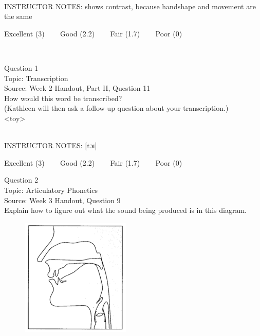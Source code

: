 \documentclass[12pt]{article}
\begin{document}
~\\
INSTRUCTOR NOTES: shows contrast, because handshape and movement are the same


\vfill
Excellent (3) ~~~ Good (2.2) ~~~ Fair (1.7) ~~~ Poor (0)
\newpage

\begin{center}
\textbf{{\color{red}{\HUGE END OF EXAM}}}\\

\end{center}
\newpage

\begin{center}
\textbf{{\color{blue}{\HUGE START OF EXAM\\}}}

\textbf{{\color{blue}{\HUGE Student ID: 54112\\}}}

\textbf{{\color{blue}{\HUGE \\}}}

\end{center}
\newpage

{\large Question 1}\\

Topic: Transcription\\
Source: Week 2 Handout, Part II, Question 11\\

How would this word be transcribed?\\ (Kathleen will then ask a follow-up question about your transcription.)\\

<toy>


~\\
INSTRUCTOR NOTES: [tɔɪ]


\vfill
Excellent (3) ~~~ Good (2.2) ~~~ Fair (1.7) ~~~ Poor (0)
\newpage

{\large Question 2}\\

Topic: Articulatory Phonetics\\
Source: Week 3 Handout, Question 9\\

Explain how to figure out what the sound being produced is in this diagram.\\

\begin{figure}[H]
\includegraphics{../images/sagittal_k.png}
\end{figure}
\end{document}

